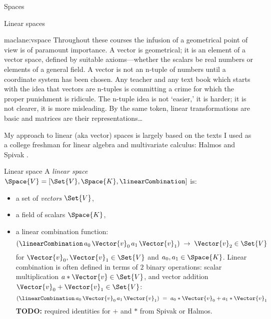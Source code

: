 \begin{plSection}{Spaces}
\begin{plSection}{Linear spaces}
\begin{plQuote}
{}
{maclane:vspace}
{Throughout these courses the infusion of a geometrical
point of view is of paramount importance. A vector
is geometrical; it is an element of a vector space, defined
by suitable axioms—whether the scalars be real numbers or
elements of a general field. A vector is not an n-tuple of
numbers until a coordinate system has been chosen. Any
teacher and any text book which starts with the idea that vectors
are n-tuples is committing a crime for which the proper
punishment is ridicule. The n-tuple idea is not ‘easier,’ it is
harder; it is not clearer, it is more misleading. By the same
token, linear transformations are basic and matrices are their
representations\ldots}
\end{plQuote}

My approach to linear (aka vector) spaces is largely based on
the texts I used as a college freshman for linear algebra and
multivariate calculus: Halmos 
and Spivak .

\begin{plDefinition}{Linear space}{}
A \textit{linear space} 
$\Space{V} = \left[ \Set{V}, \Space{K}, \linearCombination \right]$
 is:
\begin{itemize}
  \item a set of \textit{vectors} $\Set{V}$,
  \item a field  of scalars $\Space{K}$,
  \item a linear combination function: 
\begin{equation}
\left( \linearCombination 
\, a_0 \, \Vector{v}_0 \, a_1 \, \Vector{v}_1 \right) \; 
 \rightarrow \; \Vector{v}_2  \in \Set{V}
\end{equation}
for $\Vector{v}_0, \Vector{v}_1 \in \Set{V} $
and $a_0, a_1 \in \Space{K}$.
Linear combination is often defined in terms of
$2$ binary operations:
scalar multiplication $a * \Vector{v} \in \Set{V}$,
and vector addition $\Vector{v}_0 + \Vector{v}_1 \in \Set{V}$:
\begin{equation}
\left( \linearCombination 
\, a_0 \, \Vector{v}_0 \, a_1 \, \Vector{v}_1 \right) \; 
= \; a_0*\Vector{v}_0 + a_1*\Vector{v}_1
\end{equation}
\textbf{TODO:} required identities for $+$ and $*$ from Spivak or Halmos.
\end{itemize}
\end{plDefinition}


\end{plSection}
\end{plSection}
